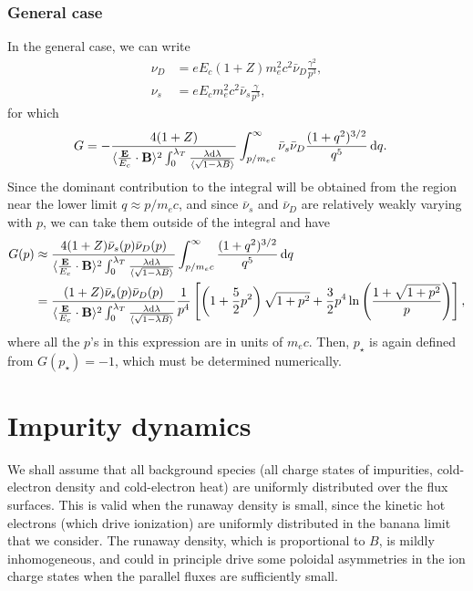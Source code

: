 \documentclass[11pt,a4paper]{article}
\newcommand{\rd}{\ensuremath{\mathrm{d}}}
\renewcommand{\b}[1]{\ensuremath{ {\bf #1 } }}
\begin{document}
\subsubsection*{General case}
In the general case, we can write
\begin{align}
\nu_D &= eE_c (1+Z)m_e^2 c^2 \bar\nu_D \frac{ \gamma^2}{p^3}, \nonumber \\
\nu_s &= eE_c m_e^2 c^2 \bar\nu_s \frac{ \gamma}{p^3},
\end{align}
for which
\begin{align}
G &=  -\frac{ 4(1+Z)}{ \langle \frac{\b{E}}{E_c}\cdot\b{B}\rangle^2 \int_0^{\lambda_T} \frac{\lambda\rd\lambda}{\langle\sqrt{1-\lambda B}\rangle}}  \int_{p/m_e c}^\infty \bar\nu_s\bar\nu_D\frac{(1+q^2)^{3/2}}{q^5} \,\rd q.
\end{align}
Since the dominant contribution to the integral will be obtained from the region near the lower limit $q \approx p/m_e c$, and since $\bar\nu_s$ and $\bar\nu_D$ are relatively weakly varying with $p$, we can take them outside of the integral and have
\begin{align}
G(p) &\approx \frac{ 4(1+Z) \bar\nu_s(p)\bar\nu_D(p)}{ \langle \frac{\b{E}}{E_c}\cdot\b{B}\rangle^2 \int_0^{\lambda_T} \frac{\lambda\rd\lambda}{\langle\sqrt{1-\lambda B}\rangle}} \int_{p/m_e c}^\infty \frac{(1+q^2)^{3/2}}{q^5} \,\rd q \nonumber \\
&=\frac{ (1+Z) \bar\nu_s(p)\bar\nu_D(p)}{ \langle \frac{\b{E}}{E_c}\cdot\b{B}\rangle^2 \int_0^{\lambda_T} \frac{\lambda\rd\lambda}{\langle\sqrt{1-\lambda B}\rangle}}\frac{1}{p^4}\left[\left(1+\frac{5}{2}p^2\right)\sqrt{1+p^2} + \frac{3}{2}p^4\ln\left(\frac{1+\sqrt{1+p^2}}{p}\right)\right],
\end{align}
where all the $p$'s in this expression are in units of $m_e c$. Then, $p_\star$ is again defined from $G(p_\star)=-1$, which must be determined numerically.



\section{Impurity dynamics}
We shall assume that all background species (all charge states of impurities, cold-electron density and cold-electron heat) are uniformly distributed over the flux surfaces. This is valid when the runaway density is small, since the kinetic hot electrons (which drive ionization) are uniformly distributed in the banana limit that we consider. The runaway density, which is proportional to $B$, is mildly inhomogeneous, and could in principle drive some poloidal asymmetries in the ion charge states when the parallel fluxes are sufficiently small. 
\end{document}
